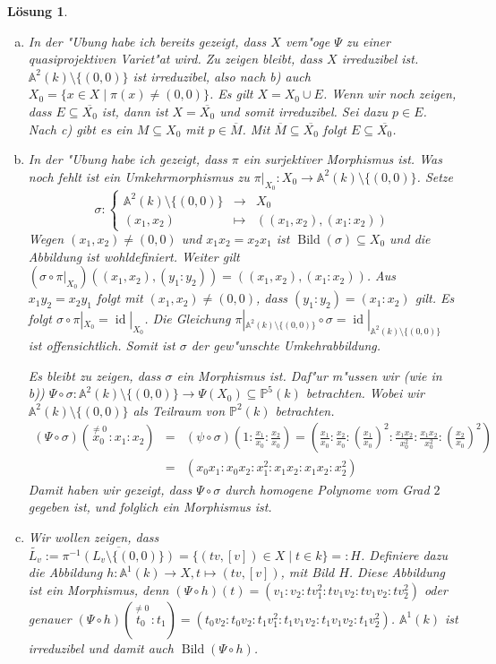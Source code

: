 \documentclass[a4paper, 12pt, numbers=noendperiod, chapterprefix=true, headsepline]{scrbook}
\theoremstyle{break}
\newtheorem{Loes}{L\"osung}
\theoremstyle{nonumberbreak}
\theoremstyle{nonumberplain}
\newcommand{\set}[2]{\{#1\mid #2\}} %
\DeclareMathOperator{\Bild}{Bild}
\DeclareMathOperator{\id}{id}
\newcommand{\A}{\mathbb{A}}
\newcommand{\IP}{\mathbb{P}}%
\begin{document}
\begin{Loes}\begin{enumerate}[a)]
\item
	In der "Ubung habe ich bereits gezeigt, dass $X$ vem"oge $\Psi$ zu einer quasiprojektiven Variet"at wird. Zu zeigen bleibt, dass $X$ irreduzibel ist. $\A^2(k) \setminus \{(0,0)\}$ ist irreduzibel, also nach b) auch $X_0= \set{x\in X}{\pi(x)\neq (0,0)}$. Es gilt $X = X_0 \cup E$. Wenn wir noch zeigen, dass $E \subseteq \overline{X_0}$ ist, dann ist $X = \overline{X_0}$ und somit irreduzibel. Sei dazu $p \in E$. Nach c) gibt es ein $M \subseteq X_0$ mit $p \in \overline{M}$. Mit $\overline{M} \subseteq \overline{X_0}$ folgt $E \subseteq \overline{X_0}$.
\item
	In der "Ubung habe ich gezeigt, dass $\pi$ ein surjektiver Morphismus ist. Was noch fehlt ist ein Umkehrmorphismus zu $\pi|_{X_0}: X_0 \to \A^2(k) \setminus\{(0,0)\}$. Setze
		\[\sigma: \left\{ \begin{array}{ccl}
			\A^2(k) \setminus\{(0,0)\} &\to& X_0\\
			(x_1,x_2) & \mapsto & ((x_1,x_2),(x_1:x_2))
		\end{array}\right.\]
	Wegen $(x_1, x_2) \neq (0,0)$ und $x_1 x_2 = x_2 x_1$ ist $\Bild(\sigma) \subseteq X_0$ und die Abbildung ist wohldefiniert. Weiter gilt $(\sigma \circ \pi|_{X_0}) ((x_1,x_2),(y_1:y_2)) = ((x_1,x_2),(x_1:x_2))$. Aus $x_1 y_2 = x_2 y_1$ folgt mit $(x_1, x_2) \neq (0,0)$, dass $(y_1:y_2) = (x_1:x_2)$ gilt. Es folgt $\sigma \circ \pi|_{X_0} = \id|_{X_0}$. Die Gleichung $\pi|_{\A^2(k) \setminus\{(0,0)\}} \circ \sigma = \id|_{\A^2(k) \setminus\{(0,0)\}}$ ist offensichtlich. Somit ist $\sigma$ der gew"unschte Umkehrabbildung.
	
	Es bleibt zu zeigen, dass $\sigma$ ein Morphismus ist. Daf"ur m"ussen wir (wie in b)) $\Psi \circ \sigma \colon \A^2(k) \setminus \{(0,0)\} \to \Psi(X_0) \subseteq \IP^5(k)$ betrachten. Wobei wir $\A^2(k) \setminus\{(0,0)\}$ als Teilraum von $\IP^2(k)$ betrachten.
	\begin{eqnarray*}
		(\Psi \circ \sigma)(\stackrel{\neq 0}{x_0}\,:x_1:x_2) 
		&=& (\psi\circ \sigma)\left(1:\frac{x_1}{x_0}:\frac{x_2}{x_0}\right) 
		= \left(\frac{x_1}{x_0}: \frac{x_2}{x_0}:\left(\frac{x_1}{x_0}\right)^2: \frac{x_1 x_2}{x_0^2}: \frac{x_1 x_2}{x_0^2}: \left(\frac{x_2}{x_0}\right)^2\right)\\
		&=& (x_0x_1:x_0x_2:x_1^2:x_1x_2:x_1x_2:x_2^2)
	\end{eqnarray*}
	Damit haben wir gezeigt, dass $\Psi \circ \sigma$ durch homogene Polynome vom Grad $2$ gegeben ist, und folglich ein Morphismus ist.
\item
	Wir wollen zeigen, dass $\widetilde{L_v} := \overline{\pi^{-1}(L_v \setminus\{(0,0)\})} = \{(tv,[v]) \in X \mid t \in k\} =: H$. Definiere dazu die Abbildung $h\colon \A^1(k) \to X, t \mapsto (tv,[v])$, mit Bild $H$. Diese Abbildung ist ein Morphismus, denn $(\Psi \circ h)(t) = (v_1:v_2:tv_1^2:tv_1v_2:tv_1v_2:tv_2^2)$ oder genauer $(\Psi \circ h)(\stackrel{\neq 0}{t_0}\,:t_1) = (t_0v_2:t_0v_2:t_1v_1^2:t_1v_1v_2:t_1v_1v_2:t_1v_2^2)$. $\A^1(k)$ ist irreduzibel und damit auch $\Bild(\Psi \circ h)$.


\end{enumerate}
\end{Loes}
\end{document}
